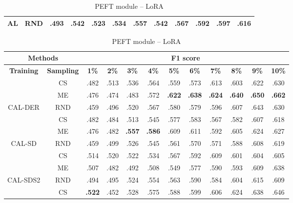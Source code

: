 \begin{table}[htbp]
\begin{subtable}{\linewidth}
\begin{tabular}{c|c|cccccccccc}
\multirow{-3}{*}{\raggedright\arraybackslash AL} & RND & .493 & .542 & .523 & .534 & .557 & .542 & .567 & .592 & .597 & .616\\
\bottomrule
\end{tabular}
\end{subtable}
\vspace{1em}
\begin{subtable}{\linewidth}
\centering
\caption{PEFT module -- LoRA}

\begin{tabular}{c|c|cccccccccc}
\toprule
\multicolumn{2}{c|}{\textbf{Methods}} & \multicolumn{10}{c}{\textbf{F1 score}} \\
\midrule
\textbf{Training} & \textbf{Sampling} & \textbf{1\%} & \textbf{2\%} & \textbf{3\%} & \textbf{4\%} & \textbf{5\%} & \textbf{6\%} & \textbf{7\%} & \textbf{8\%} & \textbf{9\%} & \textbf{10\%}\\
\midrule
 & CS & .482 & .513 & .536 & .564 & .559 & .573 & .613 & .603 & .622 & .630\\

 & ME & .476 & .474 & .483 & .572 & \textbf{.622} & \textbf{.638} & \textbf{.624} & \textbf{.640} & \textbf{.650} & \textbf{.662}\\

\multirow{-3}{*}{\raggedright\arraybackslash CAL-DER} & RND & .459 & .496 & .520 & .567 & .580 & .579 & .596 & .607 & .643 & .630\\
\midrule
 & CS & .482 & .484 & .513 & .545 & .577 & .583 & .567 & .582 & .607 & .618\\

 & ME & .476 & .482 & \textbf{.557} & \textbf{.586} & .609 & .611 & .592 & .605 & .624 & .627\\

\multirow{-3}{*}{\raggedright\arraybackslash CAL-SD} & RND & .459 & .499 & .526 & .545 & .561 & .570 & .571 & .588 & .608 & .619\\
\midrule
 & CS & .514 & .520 & .522 & .534 & .567 & .592 & .609 & .601 & .604 & .605\\

 & ME & .507 & .482 & .492 & .508 & .549 & .577 & .590 & .593 & .609 & .638\\

\multirow{-3}{*}{\raggedright\arraybackslash CAL-SDS2} & RND & .494 & .495 & .524 & .554 & .563 & .590 & .584 & .604 & .615 & .609\\
\midrule
 & CS & \textbf{.522} & .452 & .528 & .575 & .588 & .599 & .606 & .624 & .638 & .646\\


\end{tabular}
\end{subtable}
\end{table}
